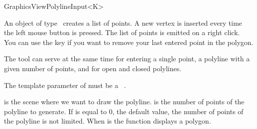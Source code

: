 \begin{ccRefClass}[Qt::]{GraphicsViewPolylineInput<K>}

\ccDefinition
An object of type \ccRefName\ creates a list of points. A new 
vertex is inserted every time the left mouse button is pressed.
The list of points is emitted on a right click. You can use the 
key if you want to remove your last entered point in the polygon.

The tool can serve at the same time for entering a single point,
a polyline with a given number of points, and for open and closed
polylines.


\ccParameters

The template parameter of  must be a \cgal\ . 

\ccInheritsFrom
{}

\ccGlue

\ccCreation
{}

{ is the scene where we want to draw the polyline.  is the
  number of points of the polyline to generate. If  is equal to 0,
  the default value, the number of points of the polyline is not
  limited. When  is  the function displays a
  polygon.}

\end{ccRefClass}







